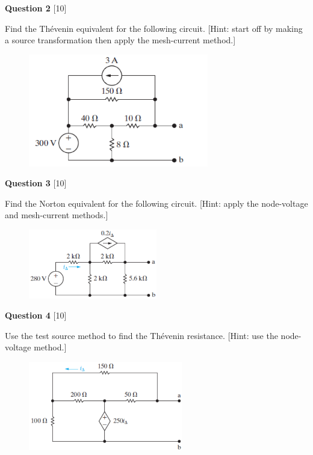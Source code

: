 \documentclass[12pt]{article}
\begin{document}
\newpage
\noindent
{\bf Question 2} [10]

Find the Th\'evenin equivalent for the following circuit. [Hint: start off by making a source transformation then apply the mesh-current method.]
\begin{figure}[h!]
     \centering
\vspace{-0.1in}
     \includegraphics[clip,width=0.7\textwidth]{Fig4-67.png}
\vspace{-0.15in}
\end{figure}

\newpage
\noindent
{\bf Question 3} [10]

Find the Norton equivalent for the following circuit. [Hint: apply the node-voltage and mesh-current methods.]
\begin{figure}[h!]
  \centering 
  \includegraphics[clip,width=0.5\textwidth]{Fig4-75.png}
\end{figure}

\newpage
\noindent
{\bf Question 4} [10]

Use the test source method to find the Th\'evenin resistance. [Hint: use the node-voltage method.]
\begin{figure}[h!]
  \centering 
  \includegraphics[clip,width=0.6\textwidth]{Fig4-79.png}
\end{figure}
\end{document}
